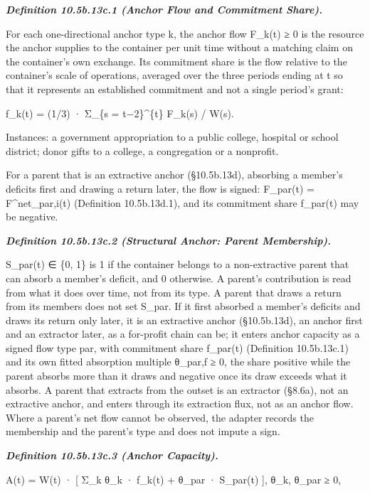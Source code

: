 \documentclass[
]{article}
\begin{document}
\emph{\textbf{Definition 10.5b.13c.1 (Anchor Flow and Commitment
Share).}}

For each one-directional anchor type k, the anchor flow F\_k(t) ≥ 0 is
the resource the anchor supplies to the container per unit time without
a matching claim on the container's own exchange. Its commitment share
is the flow relative to the container's scale of operations, averaged
over the three periods ending at t so that it represents an established
commitment and not a single period's grant:

f\_k(t) = (1/3) · Σ\_\{s = t−2\}\^{}\{t\} F\_k(s) / W(s).

Instances: a government appropriation to a public college, hospital or
school district; donor gifts to a college, a congregation or a
nonprofit.

For a parent that is an extractive anchor (§10.5b.13d), absorbing a
member's deficits first and drawing a return later, the flow is signed:
F\_par(t) = F\^{}net\_par,i(t) (Definition 10.5b.13d.1), and its
commitment share f\_par(t) may be negative.

\emph{\textbf{Definition 10.5b.13c.2 (Structural Anchor: Parent
Membership).}}

S\_par(t) ∈ \{0, 1\} is 1 if the container belongs to a non-extractive
parent that can absorb a member's deficit, and 0 otherwise. A parent's
contribution is read from what it does over time, not from its type. A
parent that draws a return from its members does not set S\_par. If it
first absorbed a member's deficits and draws its return only later, it
is an extractive anchor (§10.5b.13d), an anchor first and an extractor
later, as a for-profit chain can be; it enters anchor capacity as a
signed flow type par, with commitment share f\_par(t) (Definition
10.5b.13c.1) and its own fitted absorption multiple θ\_par,f ≥ 0, the
share positive while the parent absorbs more than it draws and negative
once its draw exceeds what it absorbs. A parent that extracts from the
outset is an extractor (§8.6a), not an extractive anchor, and enters
through its extraction flux, not as an anchor flow. Where a parent's net
flow cannot be observed, the adapter records the membership and the
parent's type and does not impute a sign.

\emph{\textbf{Definition 10.5b.13c.3 (Anchor Capacity).}}

A(t) = W(t) · {[} Σ\_k θ\_k · f\_k(t) + θ\_par · S\_par(t) {]}, θ\_k,
θ\_par ≥ 0,
\end{document}
